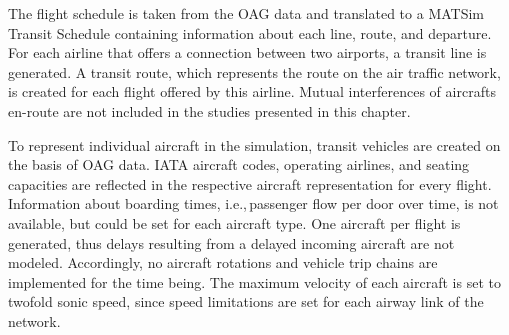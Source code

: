 The flight schedule is taken from the OAG data and translated to a MATSim Transit Schedule containing information about each line, route, and departure. 
For each airline that offers a connection between two airports, a transit line is generated. 
A transit route, which represents the route on the air traffic network, is created for each flight offered by this airline. 
Mutual interferences of aircrafts en-route are not included in the studies presented in this chapter.

To represent individual aircraft in the simulation, transit vehicles are created on the basis of OAG data. 
IATA aircraft codes, operating airlines, and seating capacities are reflected in the respective aircraft representation for every flight. 
Information about boarding times, i.e.,\,passenger flow per door over time, is not available, but could be set for each aircraft type. 
One aircraft per flight is generated, thus delays resulting from a delayed incoming aircraft are not modeled.
Accordingly, no aircraft rotations and vehicle trip chains are implemented for the time being. 
The maximum velocity of each aircraft is set to twofold sonic speed, since speed limitations are set for each airway link of the network. 

